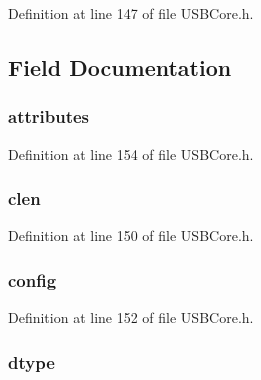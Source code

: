 Definition at line 147 of file U\+S\+B\+Core.\+h.



\subsection{Field Documentation}
\hypertarget{struct_config_descriptor_a11c20ff21a3a4209dce65e2d537374bd}{}
\subsubsection[{attributes}]{ attributes}\label{struct_config_descriptor_a11c20ff21a3a4209dce65e2d537374bd}


Definition at line 154 of file U\+S\+B\+Core.\+h.

\hypertarget{struct_config_descriptor_aa5da249d1d5f0d5206337b967ca02fc1}{}
\subsubsection[{clen}]{ clen}\label{struct_config_descriptor_aa5da249d1d5f0d5206337b967ca02fc1}


Definition at line 150 of file U\+S\+B\+Core.\+h.

\hypertarget{struct_config_descriptor_afbc86c343de9cddaf950200827a9bceb}{}
\subsubsection[{config}]{ config}\label{struct_config_descriptor_afbc86c343de9cddaf950200827a9bceb}


Definition at line 152 of file U\+S\+B\+Core.\+h.

\hypertarget{struct_config_descriptor_a0bb419531ec75697e63e9109fecf81b0}{}
\subsubsection[{dtype}]{ dtype}\label{struct_config_descriptor_a0bb419531ec75697e63e9109fecf81b0}


